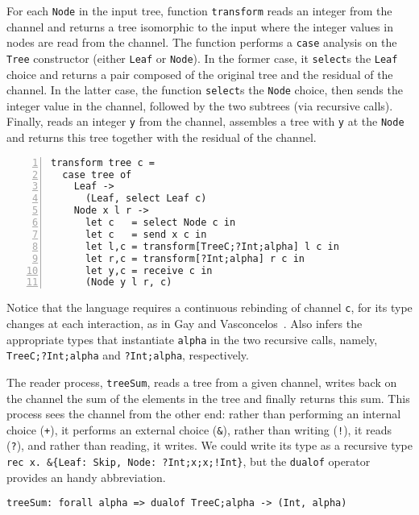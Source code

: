 For each \lstinline|Node| in the input tree, function
\lstinline|transform| reads an integer from the channel and returns a
tree isomorphic to the input where the integer values in nodes are
read from the channel.
%
The function performs a \lstinline|case| analysis on the
\lstinline|Tree| constructor (either \lstinline|Leaf| or
\lstinline|Node|). In the former case, it \lstinline|select|s the
\lstinline|Leaf| choice and returns a pair composed of the original
tree and the residual of the channel. In the latter case, the function
\lstinline|select|s the \lstinline|Node| choice, then sends the
integer value in the channel, followed by the two subtrees (via
recursive calls). Finally, reads an integer \lstinline|y| from the
channel, assembles a tree with \lstinline|y| at the \lstinline|Node|
and returns this tree together with the residual of the channel.
%
\begin{lstlisting}[numbers=left]
transform tree c =
  case tree of
    Leaf ->
      (Leaf, select Leaf c)
    Node x l r ->
      let c   = select Node c in
      let c   = send x c in
      let l,c = transform[TreeC;?Int;alpha] l c in
      let r,c = transform[?Int;alpha] r c in
      let y,c = receive c in
      (Node y l r, c)
\end{lstlisting}

Notice that the language requires a continuous rebinding of channel
\lstinline|c|, for its type changes at each interaction, as in Gay and
Vasconcelos~\cite{DBLP:journals/jfp/GayV10}. Also \freest{} infers the
appropriate types that instantiate \lstinline|alpha| in the two
recursive calls, namely, \lstinline|TreeC;?Int;alpha| and
\lstinline|?Int;alpha|, respectively.

The reader process, \lstinline|treeSum|, reads a tree from a given
channel, writes back on the channel the sum of the elements in the
tree and finally returns this sum. This process sees the channel from the
other end: rather than performing an internal choice (\lstinline|+|),
it performs an external choice (\lstinline|&|), rather than writing
(\lstinline|!|), it reads (\lstinline|?|), and rather than reading, it
writes. We could write its type as a recursive type
\lstinline|rec x. &{Leaf: Skip, Node: ?Int;x;x;!Int}|,
but the \lstinline|dualof| operator provides an handy abbreviation.
%
\begin{lstlisting}
treeSum: forall alpha => dualof TreeC;alpha -> (Int, alpha)
\end{lstlisting}

